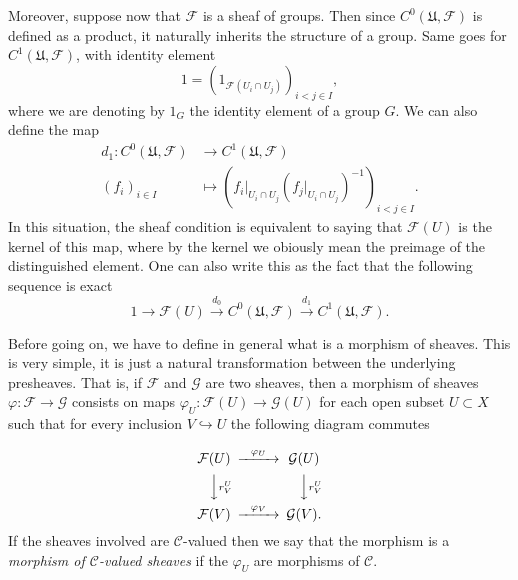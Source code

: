 \documentclass[12pt,a4paper]{article}
\begin{document}
    Moreover, suppose now that $\mathcal{F}$ is a sheaf of groups. Then since $C^0(\mathfrak{U},\mathcal{F})$ is defined as a product, it naturally inherits the structure of a group. Same goes for $C^1(\mathfrak{U},\mathcal{F})$, with identity element
    \begin{equation*}
      1=(1_{\mathcal{F}(U_i\cap U_j)})_{i<j \in I},
    \end{equation*}
where we are denoting by $1_G$ the identity element of a group $G$. We can also define the map
  \begin{align*}
    d_1: C^0(\mathfrak{U},\mathcal{F})&\longrightarrow C^1(\mathfrak{U},\mathcal{F})\\ 
    (f_{i})_{i \in I} &\longmapsto (f_{i}|_{U_i \cap U_j}(f_{j}|_{U_i \cap U_j})^{-1})_{i<j \in I}.
    \end{align*}
    In this situation, the sheaf condition is equivalent to saying that $\mathcal{F}(U)$ is the kernel of this map, where by the kernel we obiously mean the preimage of the distinguished element. One can also write this as the fact that the following sequence is exact
    \begin{equation*}
      1\rightarrow \mathcal{F}(U) \overset{d_0}{\rightarrow} C^0(\mathfrak{U},\mathcal{F}) \overset{d_1}{\rightarrow} C^1(\mathfrak{U},\mathcal{F}).
    \end{equation*}

    Before going on, we have to define in general what is a morphism of sheaves. This is very simple, it is just a natural transformation between the underlying presheaves. That is, if $\mathcal{F}$ and $\mathcal{G}$ are two sheaves, then a morphism of sheaves $\varphi:\mathcal{F} \rightarrow \mathcal{G}$ consists on maps $\varphi_U: \mathcal{F}(U) \rightarrow \mathcal{G}(U)$ for each open subset $U\subset X$ such that for every inclusion $V\hookrightarrow U$ the following diagram commutes

    \begin{equation*}
    \begin{CD}
      \mathcal{F}(U) @> \varphi_U >> \mathcal{G}(U) \\
      @VV r^U_{V} V   @VV r^U_{V} V \\
      \mathcal{F}(V) @> \varphi_V >> \mathcal{G}(V).
    \end{CD}
    \end{equation*}
    If the sheaves involved are $\mathcal{C}$-valued then we say that the morphism is a \emph{morphism of  $\mathcal{C}$-valued sheaves} if the $\varphi_U$ are morphisms of $\mathcal{C}$.
\end{document}

